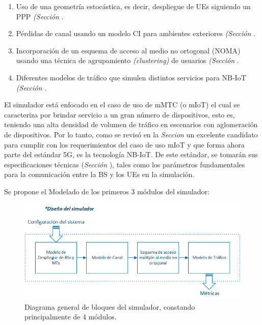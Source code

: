 \begin{enumerate}
    \item  Uso de una geometría estocástica, es decir, despliegue de UEs siguiendo un PPP \textit{(Sección }.
    \item  Pérdidas de canal usando un modelo CI para ambientes exteriores \textit{(Sección }.
    \item  Incorporación de un esquema de acceso al medio no ortogonal (NOMA) usando una técnica de agrupamiento \textit{(clustering)} de usuarios \textit{(Sección }.
    \item  Diferentes modelos de tráfico que simulen distintos servicios para NB-IoT \textit{(Sección }.
\end{enumerate}

El simulador está enfocado en el caso de uso de mMTC (o mIoT) el cual se caracteriza por brindar servicio a un gran número de dispositivos, esto es, teniendo una alta densidad de volumen de tráfico en escenarios con aglomeración de dispositivos. Por lo tanto, como se revisó en la \textit{Seccion } un excelente candidato para cumplir con los requerimientos del caso de uso mIoT y que forma ahora parte del estándar 5G, es la tecnología NB-IoT. De este estándar, se tomarán sus especificaciones técnicas (\textit{Sección }), tales como los parámetros fundamentales para la comunicación entre la BS y los UEs en la simulación.\newline

Se propone el Modelado de los primeros 3 módulos del simulador:

\begin{figure}[th]
    \centering
    \includegraphics[scale=1]{Figures/Diagrama general de bloques del simulador}
    \decoRule
    \caption[Diagrama general de bloques del simulador, constando principalmente de 4 módulos.]{Diagrama general de bloques del simulador, constando principalmente de 4 módulos.}
    \label{fig:DiagramaGral}
\end{figure}

